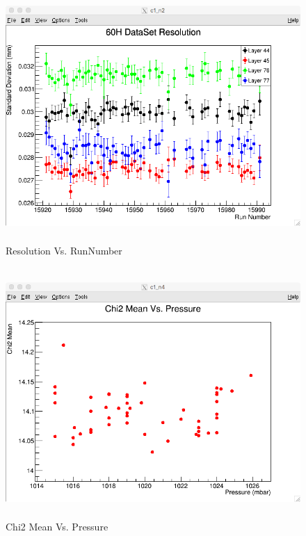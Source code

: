 \documentclass[./Thesis]{subfiles}
\begin{document}
\begin{figure}
	\centerline{\includegraphics[height=95mm]{60HDataSetResidual.png}}
	\caption[Resolution Vs Run Number]{Resolution Vs. RunNumber}
	\label{fig:ResRun}
\end{figure} 


	
\begin{figure}
	\centerline{\includegraphics[height=95mm]{Chi2MeanVsPressure.png}}
	\caption[Chi2 Mean Vs. Pressure]{Chi2 Mean Vs. Pressure}
	\label{fig:chiMeanPres}
\end{figure}
	 
\end{document}
